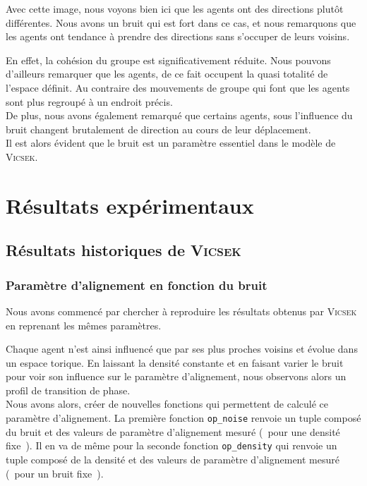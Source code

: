 \documentclass[french, a4paper, 12pt, openany]{report}
\begin{document}
	
Avec cette image, nous voyons bien ici que les agents ont des directions plutôt différentes. Nous avons un bruit qui est fort dans ce cas, et nous remarquons que les agents ont tendance à prendre des directions sans s'occuper de leurs voisins. 

En effet, la cohésion du groupe est significativement réduite. Nous pouvons d'ailleurs remarquer que les agents, de ce fait occupent la quasi totalité de l'espace définit. Au contraire des mouvements de groupe qui font que les agents sont plus regroupé à un endroit précis.  \\

De plus, nous avons également remarqué que certains agents, sous l'influence du bruit changent brutalement de direction au cours de leur déplacement.\\

Il est alors évident que le bruit est un paramètre essentiel dans le modèle de \textsc{Vicsek}.\\



   
\chapter{Résultats expérimentaux} \label{chap:resultats}
\section{Résultats historiques de \textsc{Vicsek}}
\subsection{Paramètre d'alignement en fonction du bruit} 
	Nous avons commencé par chercher à reproduire les résultats obtenus par \textsc{Vicsek} en reprenant les mêmes paramètres.
	
	Chaque agent n'est ainsi influencé que par ses plus proches voisins et évolue dans un espace torique. En laissant la densité constante et en faisant varier le bruit pour voir son influence sur le paramètre d'alignement, nous observons alors un profil de transition de phase.\\
	
	Nous avons alors, créer de nouvelles fonctions qui permettent de calculé ce paramètre d'alignement. La première fonction \verb|op_noise| renvoie un tuple composé du bruit et des valeurs de paramètre d'alignement mesuré (~pour une densité fixe~). Il en va de même pour la seconde fonction \verb|op_density| qui renvoie un tuple composé de la densité et des valeurs de paramètre d'alignement mesuré (~pour un bruit fixe~).
	
\end{document}
